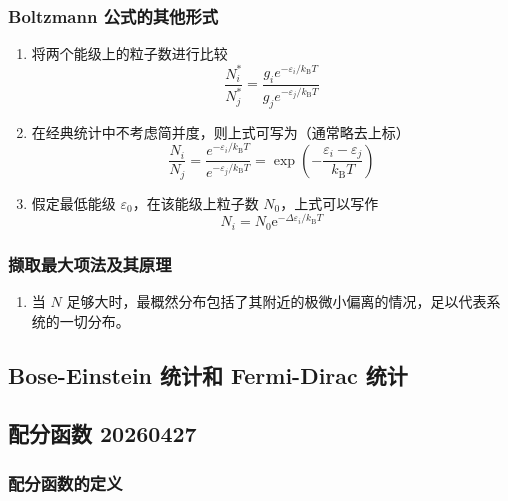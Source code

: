 \subsubsection{Boltzmann 公式的其他形式}
\begin{enumerate}
    \item 将两个能级上的粒子数进行比较
    \begin{equation}
        \frac{N^*_i}{N^*_j} = \frac{g_i e^{-\varepsilon_i / k_\mathrm{B} T}}{g_j e^{-\varepsilon_j/k_\mathrm{B}T}}
    \end{equation}
    \item 在经典统计中不考虑简并度，则上式可写为（通常略去上标）
    \begin{equation}
        \frac{N_i}{N_j} = \frac{e^{-\varepsilon_i / k_\mathrm{B} T}}{e^{-\varepsilon_j/k_\mathrm{B}T}} = \exp\left(-\frac{\varepsilon_i - \varepsilon_j}{k_\mathrm{B}T}\right)
    \end{equation}
    \item 假定最低能级 $\varepsilon_0$，在该能级上粒子数 $N_0$，上式可以写作
    \begin{equation}
        N_i = N_0 \mathrm{e}^{-\Delta \varepsilon_i / k_\mathrm{B} T}
    \end{equation}
\end{enumerate}

\subsubsection{撷取最大项法及其原理}

\begin{enumerate}
    \item 当 $N$ 足够大时，最概然分布包括了其附近的极微小偏离的情况，足以代表系统的一切分布。
\end{enumerate}

\subsection{Bose-Einstein 统计和 Fermi-Dirac 统计}

\subsection{配分函数 20260427}

\subsubsection{配分函数的定义}

